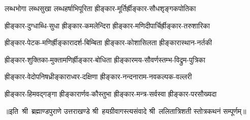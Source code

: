 \twolineshloka
{लब्धभोगा लब्धसुखा लब्धहर्षाभिपूरिता}
{ह्रीङ्कार-मूर्तिर्ह्रीङ्कार-सौधशृङ्गकपोतिका}

\twolineshloka
{ह्रीङ्कार-दुग्धाब्धि-सुधा ह्रीङ्कार-कमलेन्दिरा}
{ह्रीङ्कार-मणिदीपार्चिर्ह्रीङ्कार-तरुशारिका}

\twolineshloka
{ह्रीङ्कार-पेटक-मणिर्ह्रीङ्कारादर्श-बिम्बिता}
{ह्रीङ्कार-कोशासिलता ह्रीङ्कारास्थान-नर्तकी}

\twolineshloka
{ह्रीङ्कार-शुक्तिका-मुक्तामणिर्ह्रीङ्कार-बोधिता}
{ह्रीङ्कारमय-सौवर्णस्तम्भ-विद्रुम-पुत्रिका}

\twolineshloka
{ह्रीङ्कार-वेदोपनिषध्रीङ्काराध्वर-दक्षिणा}
{ह्रीङ्कार-नन्दनाराम-नवकल्पक-वल्लरी}

\twolineshloka
{ह्रीङ्कार-हिमवद्गङ्गा ह्रीङ्कारार्णव-कौस्तुभा}
{ह्रीङ्कार-मन्त्र-सर्वस्वा ह्रीङ्कार-परसौख्यदा}

॥इति~श्री~ब्रह्माण्डपुराणे उत्तराखण्डे श्री~हयग्रीवागस्त्यसंवादे 
श्री~ललितात्रिशती स्तोत्रकथनं सम्पूर्णम्॥
